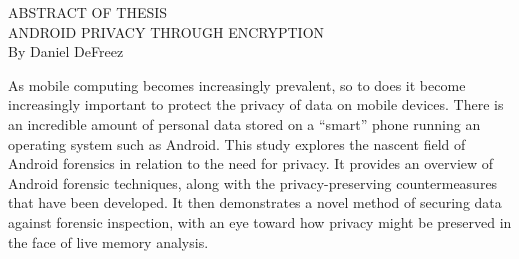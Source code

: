 \singlespacing
\begin{center}
ABSTRACT OF THESIS \\[1.0in]
ANDROID PRIVACY THROUGH ENCRYPTION \\[0.25in]
By Daniel DeFreez \\[1.25in]
\end{center}

\noindent
As mobile computing becomes increasingly prevalent, so to does it become increasingly important to protect the privacy of data on
mobile devices. There is an incredible amount of personal data stored on a ``smart'' phone running an operating system such as
Android. This study explores the nascent field of Android forensics in relation to the need for privacy. It provides an overview of
Android forensic techniques, along with the privacy-preserving countermeasures that have been developed. It then demonstrates a
novel method of securing data against forensic inspection, with an eye toward how privacy might be preserved in the face of live
memory analysis.

\restoregeometry
